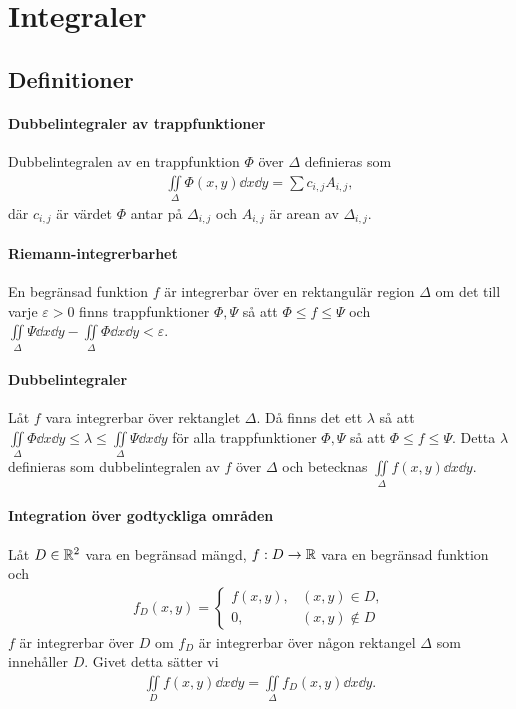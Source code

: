 \section{Integraler}

\subsection{Definitioner}

\paragraph{Dubbelintegraler av trappfunktioner}
Dubbelintegralen av en trappfunktion $\Phi$ över $\Delta$ definieras som
\begin{align*}
	\iint\limits_{\Delta}\Phi (x, y)\dd{x}\dd{y} = \sum c_{i, j}A_{i, j},
\end{align*}
där $c_{i, j}$ är värdet $\Phi$ antar på $\Delta_{i, j}$ och $A_{i, j}$ är arean av $\Delta_{i, j}$.

\paragraph{Riemann-integrerbarhet}
En begränsad funktion $f$ är integrerbar över en rektangulär region $\Delta$ om det till varje $\varepsilon > 0$ finns trappfunktioner $\Phi, \Psi$ så att $\Phi\leq f\leq \Psi$ och $\iint\limits_{\Delta}\Psi\dd{x}\dd{y} - \iint\limits_{\Delta}\Phi\dd{x}\dd{y} < \varepsilon$.

\paragraph{Dubbelintegraler}
Låt $f$ vara integrerbar över rektanglet $\Delta$. Då finns det ett $\lambda$ så att $\iint\limits_{\Delta}\Phi\dd{x}\dd{y}\leq\lambda\leq\iint\limits_{\Delta}\Psi\dd{x}\dd{y}$ för alla trappfunktioner $\Phi, \Psi$ så att $\Phi\leq f\leq\Psi$. Detta $\lambda$ definieras som dubbelintegralen av $f$ över $\Delta$ och betecknas $\iint\limits_{\Delta}f(x, y)\dd{x}\dd{y}$.

\paragraph{Integration över godtyckliga områden}
Låt $D\in\mathbb{R}^2$ vara en begränsad mängd, $f: D\to\mathbb{R}$ vara en begränsad funktion och
\begin{align*}
	f_D(x, y) =
	\begin{cases}
		f(x, y), &(x, y)\in D, \\
		0,       &(x, y)\not\in D
	\end{cases}
\end{align*}
$f$ är integrerbar över $D$ om $f_D$ är integrerbar över någon rektangel $\Delta$ som innehåller $D$. Givet detta sätter vi
\begin{align*}
	\iint\limits_{D}f(x, y)\dd{x}\dd{y} = \iint\limits_{\Delta}f_D(x, y)\dd{x}\dd{y}.
\end{align*}

